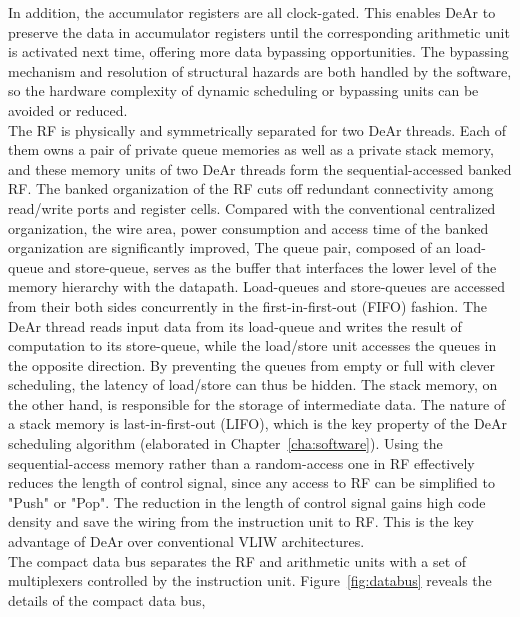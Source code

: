         In addition, the accumulator registers are all clock-gated.
        This enables DeAr to preserve the data in accumulator registers until the corresponding arithmetic unit is activated next time, 
        offering more data bypassing opportunities.
        The bypassing mechanism and resolution of structural hazards are both handled by the software, 
        so the hardware complexity of dynamic scheduling or bypassing units can be avoided or reduced.
        \\\indent
        The RF is physically and symmetrically separated for two DeAr threads.
        Each of them owns a pair of private queue memories as well as a private stack memory, 
        and these memory units of two DeAr threads form the sequential-accessed banked RF.
        The banked organization of the RF cuts off redundant connectivity among read/write ports and register cells.
        Compared with the conventional centralized organization, 
        the wire area, power consumption and access time of the banked organization are significantly improved, 
        The queue pair, composed of an load-queue and store-queue, 
        serves as the buffer that interfaces the lower level of the memory hierarchy with the datapath.
        Load-queues and store-queues are accessed from their both sides concurrently in the first-in-first-out (FIFO) fashion.
        The DeAr thread reads input data from its load-queue and writes the result of computation to its store-queue, 
        while the load/store unit accesses the queues in the opposite direction.
        By preventing the queues from empty or full with clever scheduling, the latency of load/store can thus be hidden.
        The stack memory, on the other hand, is responsible for the storage of intermediate data.
        The nature of a stack memory is last-in-first-out (LIFO), 
        which is the key property of the DeAr scheduling algorithm (elaborated in Chapter~\ref{cha:software}).
        Using the sequential-access memory rather than a random-access one in RF effectively reduces the length of control signal, 
        since any access to RF can be simplified to "Push" or "Pop".
        The reduction in the length of control signal gains high code density and save the wiring from the instruction unit to RF.
        This is the key advantage of DeAr over conventional VLIW architectures.
        \\\indent
        The compact data bus separates the RF and arithmetic units with a set of multiplexers controlled by the instruction unit.
        Figure~\ref{fig:databus} reveals the details of the compact data bus, 

